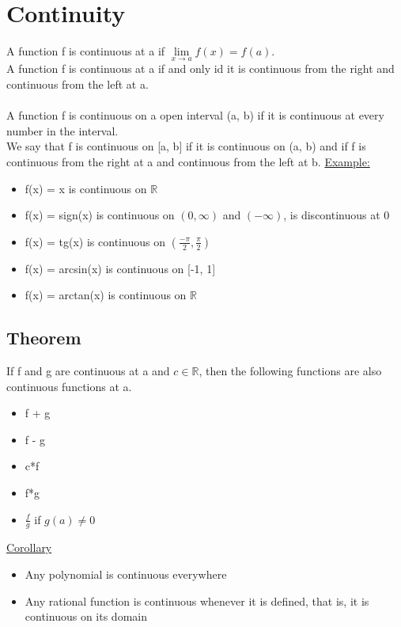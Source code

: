 \documentclass{article}
\begin{document}
\section{Continuity}
 A function f is continuous at a if $\lim\limits_{x\to a} f(x) = f(a)$. \\
 A function f is continuous at a if and only id it is continuous from the right and continuous from the left at a. \\ \\
 A function f is continuous on a open interval (a, b) if it is continuous at every number in the interval.\\ We say that f is continuous on [a, b] if it is continuous on (a, b) and if f is continuous from the right at a and continuous from the left at b. 
 \underline{Example:}\\
 \begin{itemize}
 	\item f(x) = x is continuous on $\mathbb{R}$
 	\item f(x) = sign(x) is continuous on $(0, \infty)$ and $(-\infty)$, is discontinuous at 0
 	\item f(x) = tg(x) is continuous on $(\frac{-\pi}{2}, \frac{\pi}{2})$
 	\item f(x) = arcsin(x) is continuous on [-1, 1]
 	\item f(x) = arctan(x) is continuous on $\mathbb{R}$
 \end{itemize}

\subsection{Theorem}
If f and g are continuous at a and $c\in\mathbb{R}$, then the following functions are also continuous functions at a. 
\begin{itemize}
	\item f + g
	\item f - g
	\item c*f
	\item f*g
	\item $\frac{f}{g}$ if $g(a) \neq 0$
\end{itemize}
\underline{Corollary}
\begin{itemize}
	\item Any polynomial is continuous everywhere
	\item Any rational function is continuous whenever it is defined, that is, it is continuous on its domain
\end{itemize}
\end{document}
